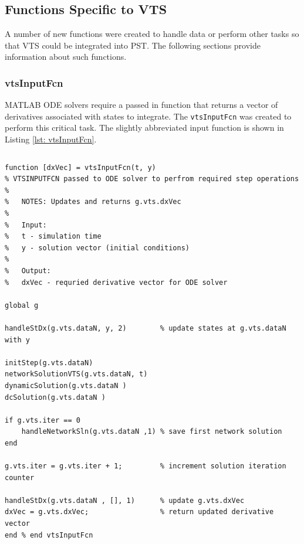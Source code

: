 \subsection{Functions Specific to VTS}  
A number of new functions were created to handle data or perform other tasks so that VTS could be integrated into PST.
The following sections provide information about such functions.

\pagebreak
\subsubsection{vtsInputFcn} 
MATLAB ODE solvers require a passed in function that returns a vector of derivatives associated with states to integrate.
The \verb|vtsInputFcn| was created to perform this critical task.
The slightly abbreviated input function is shown in Listing \ref{lst: vtsInputFcn}.

\begin{lstlisting}[caption={Abbreviated vtsInputFcn},label={lst: vtsInputFcn}]
\end{lstlisting}\vspace{-2 em}
\begin{verbatim}
function [dxVec] = vtsInputFcn(t, y)
% VTSINPUTFCN passed to ODE solver to perfrom required step operations
%
%   NOTES: Updates and returns g.vts.dxVec
%
%   Input:
%   t - simulation time
%   y - solution vector (initial conditions)
%
%   Output:
%   dxVec - requried derivative vector for ODE solver

global g

handleStDx(g.vts.dataN, y, 2)        % update states at g.vts.dataN with y

initStep(g.vts.dataN)
networkSolutionVTS(g.vts.dataN, t)
dynamicSolution(g.vts.dataN )
dcSolution(g.vts.dataN )

if g.vts.iter == 0
    handleNetworkSln(g.vts.dataN ,1) % save first network solution
end

g.vts.iter = g.vts.iter + 1;         % increment solution iteration counter

handleStDx(g.vts.dataN , [], 1)      % update g.vts.dxVec
dxVec = g.vts.dxVec;                 % return updated derivative vector
end % end vtsInputFcn
\end{verbatim}

